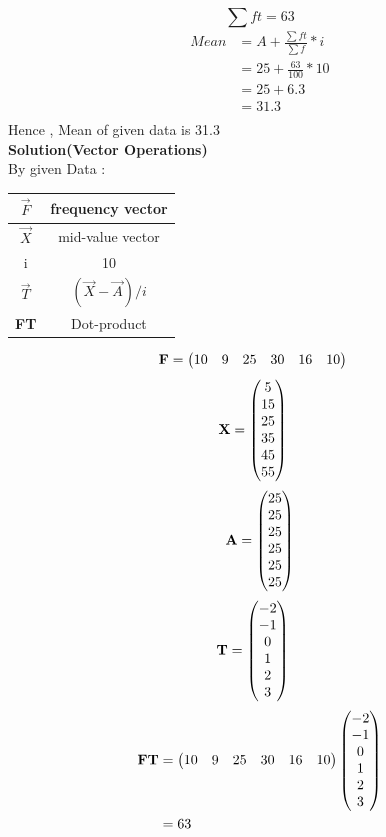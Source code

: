 \documentclass[journal,12pt,twocolumn]{IEEEtran}
\begin{document}
\begin{equation*}
\sum ft = 63
\end{equation*}
\begin{align*}
Mean & = A + \frac{ \sum ft }{\sum f} * i\\
     & = 25 + \frac{63}{100} * 10\\
     & = 25 + 6.3\\
     & = 31.3\\\
\end{align*}
Hence , Mean of given data is 31.3\\
\textbf{Solution(Vector Operations)}\\
By given Data :\\
\begin{table}[h!]
\center
{
\begin{tabular}{|c|c|}
\hline
$\vec{F}$ & frequency vector\\
\hline
$\vec{X}$ & mid-value vector\\
\hline
i &  10\\
\hline
$\vec{T}$ &  $(\vec{X}-\vec{A})/i$\\
\hline
\textbf{FT} &  Dot-product\\
\hline
\end{tabular}
}
\end{table}
\begin{align}
\mathbf{F} & = 
\begin{pmatrix}10 & 9 & 25 & 30 & 16 & 10\end{pmatrix}
\end{align}
\begin{align}
\mathbf{X} & = 
\begin{pmatrix}5 \\ 15 \\ 25 \\ 35 \\ 45 \\ 55\end{pmatrix}
\end{align}
\begin{align}
\mathbf{A} = 
\begin{pmatrix}25\\25\\25\\25\\25\\25\end{pmatrix}
\end{align}
\begin{align}
\mathbf{T} & =
\begin{pmatrix}-2 \\ -1 \\ 0 \\ 1 \\ 2 \\ 3 \end{pmatrix}
\end{align}
\begin{align}
\textbf{FT}  & =\begin{pmatrix}10 & 9 & 25 & 30 & 16 & 10\end{pmatrix}\begin{pmatrix}-2\\-1\\0\\1\\2\\3\end{pmatrix}\\ 
\nonumber& = 63
\end{align}
\end{document}
